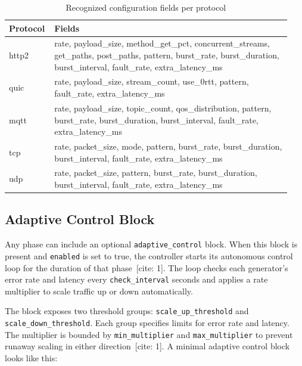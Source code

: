 \begin{table}[h]
\centering
\caption{Recognized configuration fields per protocol}
\label{tab:config-fields}
\footnotesize
\begin{tabular}{@{}p{0.13\linewidth}p{0.81\linewidth}@{}}
\toprule
\textbf{Protocol} & \textbf{Fields} \\
\midrule
http2    & rate, payload\_size, method\_get\_pct, concurrent\_streams, get\_paths,
           post\_paths, pattern, burst\_rate, burst\_duration, burst\_interval,
           fault\_rate, extra\_latency\_ms \\
\addlinespace
quic     & rate, payload\_size, stream\_count, use\_0rtt, pattern,
           fault\_rate, extra\_latency\_ms \\
\addlinespace
mqtt     & rate, payload\_size, topic\_count, qos\_distribution, pattern,
           burst\_rate, burst\_duration, burst\_interval, fault\_rate, extra\_latency\_ms \\
\addlinespace
tcp      & rate, packet\_size, mode, pattern, burst\_rate, burst\_duration,
           burst\_interval, fault\_rate, extra\_latency\_ms \\
\addlinespace
udp      & rate, packet\_size, pattern, burst\_rate, burst\_duration,
           burst\_interval, fault\_rate, extra\_latency\_ms \\
\bottomrule
\end{tabular}
\end{table}

\subsection{Adaptive Control Block}

\noindent Any phase can include an optional \texttt{adaptive\_control} block.
When this block is present and \texttt{enabled} is set to true, the controller starts
its autonomous control loop for the duration of that phase~[cite: 1].
The loop checks each generator's error rate and latency every \texttt{check\_interval}
seconds and applies a rate multiplier to scale traffic up or down automatically.

\noindent The block exposes two threshold groups: \texttt{scale\_up\_threshold} and
\texttt{scale\_down\_threshold}.
Each group specifies limits for error rate and latency.
The multiplier is bounded by \texttt{min\_multiplier} and \texttt{max\_multiplier}
to prevent runaway scaling in either direction~[cite: 1].
A minimal adaptive control block looks like this:

